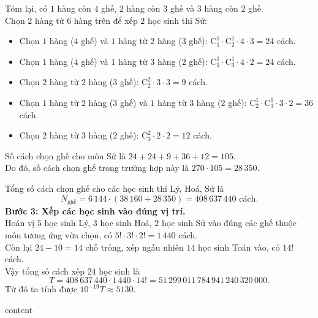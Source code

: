 \begin{ex}
{\begin{enumerate}[\it TH 1:]
\begin{itemize}
			\end{itemize}
			Tóm lại, có $1$ hàng còn $4$ ghế, $2$ hàng còn $3$ ghế và $3$ hàng còn $2$ ghế.\\
			Chọn $2$ hàng từ $6$ hàng trên để xếp $2$ học sinh thi Sử:
			\begin{itemize}
				\item Chọn $1$ hàng ($4$ ghế) và $1$ hàng từ $2$ hàng ($3$ ghế): $\mathrm{C}_1^1 \cdot \mathrm{C}_2^1 \cdot 4 \cdot 3 = 24$ cách.
				\item Chọn $1$ hàng ($4$ ghế) và $1$ hàng từ $3$ hàng ($2$ ghế): $\mathrm{C}_1^1 \cdot \mathrm{C}_3^1 \cdot 4 \cdot 2 = 24$ cách.
				\item Chọn $2$ hàng từ $2$ hàng ($3$ ghế): $\mathrm{C}_2^2 \cdot 3 \cdot 3 = 9$ cách.
				\item Chọn $1$ hàng từ $2$ hàng ($3$ ghế) và $1$ hàng từ $3$ hàng ($2$ ghế): $\mathrm{C}_2^1 \cdot \mathrm{C}_3^1 \cdot 3 \cdot 2 = 36$ cách.
				\item Chọn $2$ hàng từ $3$ hàng ($2$ ghế): $\mathrm{C}_3^2 \cdot 2 \cdot 2 = 12$ cách.
			\end{itemize}
			Số cách chọn ghế cho môn Sử là $24 + 24 + 9 + 36 + 12 = 105$.\\
			Do đó, số cách chọn ghế trong trường hợp này là $270 \cdot 105 = 28\,350$.
		\end{enumerate}
		Tổng số cách chọn ghế cho các học sinh thi Lý, Hoá, Sử là
		\[N_{\text{ghế}} = 6\,144 \cdot (38\,160 + 28\,350) = 408\,637\,440 \text{ cách.}\]
		\textbf{Bước 3: Xếp các học sinh vào đúng vị trí.}\\
		Hoán vị $5$ học sinh Lý, $3$ học sinh Hoá, $2$ học sinh Sử vào đúng các ghế thuộc môn tương ứng vừa chọn, có $5! \cdot 3! \cdot 2! = 1\,440$ cách.\\
		Còn lại $24 - 10 = 14$ chỗ trống, xếp ngẫu nhiên $14$ học sinh Toán vào, có $14!$ cách.\\
		Vậy tổng số cách xếp $24$ học sinh là
		\[T = 408\,637\,440 \cdot 1\,440 \cdot 14! =51\,299\,011\,784\,941\,240\,320\,000.\]
		Từ đó ta tính được $10^{-19}T \approx 5130$.
	}
\end{ex}
\begin{ex}
	content
\end{ex}
